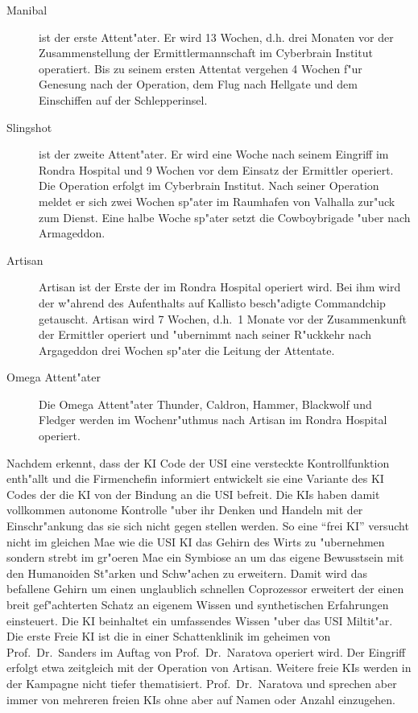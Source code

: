 \begin{description}
    \item[Manibal] ist der erste Attent"ater. Er wird 13 Wochen, d.h. drei Monaten vor der Zusammenstellung der Ermittlermannschaft im 
        Cyberbrain Institut operatiert. Bis zu seinem ersten Attentat vergehen 4 Wochen f"ur Genesung nach der Operation, dem Flug nach Hellgate und dem Einschiffen auf der Schlepperinsel.
    \item[Slingshot] ist der zweite Attent"ater. Er wird eine Woche nach seinem Eingriff im Rondra Hospital und 9 Wochen vor dem Einsatz 
        der Ermittler operiert. Die Operation erfolgt im Cyberbrain Institut. Nach seiner Operation meldet er sich zwei Wochen sp"ater im Raumhafen von Valhalla zur"uck zum Dienst. Eine halbe Woche sp"ater setzt die Cowboybrigade "uber nach Armageddon.
    \item[Artisan] Artisan ist der Erste der im Rondra Hospital operiert wird. Bei ihm wird der w"ahrend des Aufenthalts auf Kallisto 
        besch"adigte Commandchip getauscht. Artisan wird 7 Wochen, d.h.~1 Monate vor der Zusammenkunft der Ermittler operiert und "ubernimmt nach seiner R"uckkehr nach Argageddon drei Wochen sp"ater die Leitung der Attentate.
    \item[Omega Attent"ater] Die Omega Attent"ater Thunder, Caldron, Hammer, Blackwolf und Fledger werden im Wochenr"uthmus nach Artisan im 
        Rondra Hospital operiert.
\end{description}

Nachdem \ml{} erkennt, dass der KI Code der USI eine versteckte Kontrollfunktion enth"allt und die Firmenchefin informiert entwickelt sie eine Variante des KI Codes der die KI von der Bindung an die USI befreit. Die KIs haben damit vollkommen autonome Kontrolle "uber ihr Denken und Handeln mit der Einschr"ankung das sie sich nicht gegen \ml{} stellen werden. So eine "`frei KI"' versucht nicht im gleichen Ma\3e wie die USI KI das Gehirn des Wirts zu "ubernehmen sondern strebt im gr"o\3eren Ma\3e ein Symbiose an um das eigene Bewusstsein mit den Humanoiden St"arken und Schw"achen zu erweitern. Damit wird das befallene Gehirn um einen unglaublich schnellen Coprozessor erweitert der einen breit gef"achterten Schatz an eigenem Wissen und synthetischen Erfahrungen einsteuert. Die KI beinhaltet ein umfassendes Wissen "uber das USI Miltit"ar. Die erste Freie KI ist \xl{} die in einer Schattenklinik im geheimen von Prof.~Dr.~Sanders im Auftag von Prof.~Dr.~Naratova operiert wird. Der Eingriff erfolgt etwa zeitgleich mit der Operation von Artisan. Weitere freie KIs werden in der Kampagne nicht tiefer thematisiert. Prof.~Dr.~Naratova und \ml{} sprechen aber immer von mehreren freien KIs ohne aber auf Namen oder Anzahl einzugehen.


